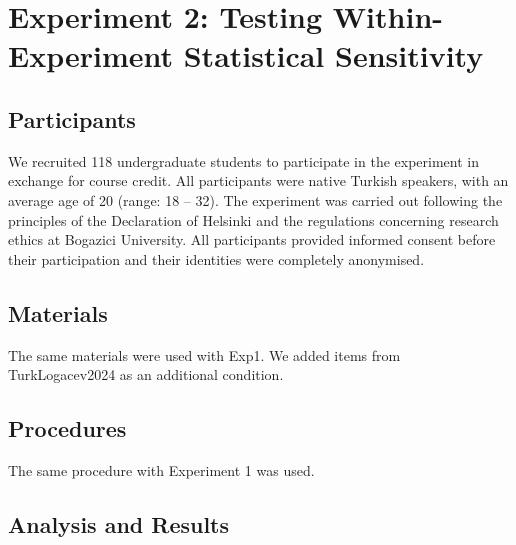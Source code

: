 \documentclass[
  authoryear,
  preprint]{elsarticle}
\begin{document}
\section{Experiment 2: Testing Within-Experiment Statistical
Sensitivity}\label{experiment-2-testing-within-experiment-statistical-sensitivity}

\subsection{Participants}\label{participants-1}

We recruited 118 undergraduate students to participate in the experiment
in exchange for course credit. All participants were native Turkish
speakers, with an average age of 20 (range: 18 -- 32). The experiment
was carried out following the principles of the Declaration of Helsinki
and the regulations concerning research ethics at Bogazici University.
All participants provided informed consent before their participation
and their identities were completely anonymised.

\subsection{Materials}\label{materials-1}

The same materials were used with Exp1. We added items from
TurkLogacev2024 as an additional condition.

\subsection{Procedures}\label{procedures-1}

The same procedure with Experiment 1 was used.

\subsection{Analysis and Results}\label{analysis-and-results-1}
\end{document}
